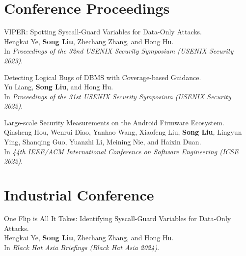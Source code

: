 \documentclass[letterpaper,10pt]{article}
\newcommand{\shorterSection}[1]{\vspace{-10pt}\section{#1}}
\begin{document}
\shorterSection{\textcolor{titleblue}{Conference Proceedings}}
  \begin{enumerate}[label={[\arabic*]}]


    \item VIPER: Spotting Syscall-Guard Variables for Data-Only Attacks. \\
          Hengkai Ye, \textbf{Song Liu}, Zhechang Zhang, and Hong Hu. \\
          In \textit{Proceedings of the 32nd USENIX Security Symposium (USENIX Security 2023)}.

      
    \item Detecting Logical Bugs of DBMS with Coverage-based Guidance. \\
          Yu Liang, \textbf{Song Liu}, and Hong Hu. \\
          In \textit{Proceedings of the 31st USENIX Security Symposium (USENIX Security 2022)}.

    \item Large-scale Security Measurements on the Android Firmware Ecosystem. \\
          Qinsheng Hou, Wenrui Diao, Yanhao Wang, Xiaofeng Liu, \textbf{Song Liu}, Lingyun Ying, Shanqing Guo, Yuanzhi Li, Meining Nie, and Haixin Duan. \\
          In \textit{44th IEEE/ACM International Conference on Software Engineering (ICSE 2022)}.

  \end{enumerate}

\shorterSection{\textcolor{titleblue}{Industrial Conference}}
  \begin{enumerate}[label={[\arabic*]}]
    \item One Flip is All It Takes: Identifying Syscall-Guard Variables for Data-Only Attacks. \\
          Hengkai Ye, \textbf{Song Liu}, Zhechang Zhang, and Hong Hu. \\
          In \textit{Black Hat Asia Briefings (Black Hat Asia 2024)}.
  \end{enumerate}
\end{document}

